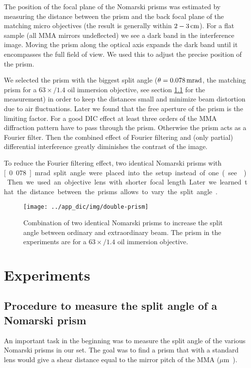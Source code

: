 The position of the focal plane of the Nomarski prisms was estimated
by measuring the distance between the prism and the back focal plane
of the matching micro objectives (the result is generally within
$\unit[2-3]{cm}$). For a flat sample (all MMA mirrors undeflected) we
see a dark band in the interference image. Moving the prism along the
optical axis expands the dark band until it encompasses the full field
of view. We used this to adjust the precise position of the prism.

We selected the prism with the biggest split angle
($\theta=\unit[0.078]{mrad}$, the matching prism for a $63\times/1.4$
oil immersion objective, see section \ref{sec:prism} for the
measurement) in order to keep the distances small and minimize beam
distortion due to air fluctuations. Later we found that the free
aperture of the prism is the limiting factor. For a good DIC effect at
least three orders of the MMA diffraction pattern have to pass through
the prism. Otherwise the prism acts as a Fourier filter. Then the
combined effect of Fourier filtering and (only partial) differential
interference greatly diminishes the contrast of the image.

To reduce the Fourier filtering effect, two identical Nomarski prisms
with \unit[0.078]{mrad} split angle were placed into the setup instead
of one (see ). Then we used an objective lens
with shorter focal length. Later we learned that the distance between
the prisms allows to vary the split angle \citep{Schwertner2008}.


\begin{figure}[htb]
  \centering
  \texttt{[image: ../app\_dic/img/double-prism]}
  \caption{Combination of two identical Nomarski prisms to increase
    the split angle between ordinary and extraordinary beam. The prism
    in the experiments are for a $63\times/1.4$ oil immersion
    objective.}
  \label{fig:double-prism}
\end{figure}

\section{Experiments}
\subsection{Procedure to measure the split angle of a Nomarski prism}
\label{sec:prism}
An important task in the beginning was to measure the split angle of
the various Nomarski prisms in our set. The goal was to find a prism
that with a standard lens would give a shear distance equal to the
mirror pitch of the MMA (\unit[16]{$\mu$m}).

